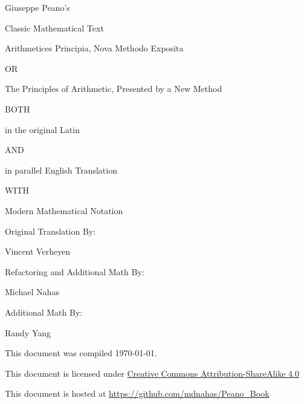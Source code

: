\documentclass{book}
\begin{document}
 


\pagestyle{empty}


%
{ \centering

  \vspace*{0.5cm}
  
  {\Large Giuseppe Peano's}

  {\normalsize Classic Mathematical Text}

  \vspace{1cm}

  {\Huge Arithmetices Principia, Nova Methodo Exposita}

  \vspace{0.5cm}

  {\Large OR}

  \vspace{0.5cm}

  {\Huge The Principles of Arithmetic, Presented by a New Method}

  \vspace{1cm}

  BOTH %

  {\Large in the original Latin}

  AND

  {\Large in parallel English Translation}

  WITH

  {\Large Modern Mathematical Notation}
  
  \vspace{0.7cm}

  Original Translation By:

  {\Large Vincent Verheyen}

  \vspace{0.5cm}

  Refactoring and Additional Math By:

  Michael Nahas

  \vspace{0.5cm}

  Additional Math By:

  Randy Yang

  
  \vfill

  
  \normalsize This document was compiled \today.

  \normalsize This document is licensed under \href{http://creativecommons.org/licenses/by-sa/4.0/}{Creative Commons Attribution-ShareAlike 4.0}

  \normalsize This document is hosted at \url{https://github.com/mdnahas/Peano_Book}

} %
\end{document}
